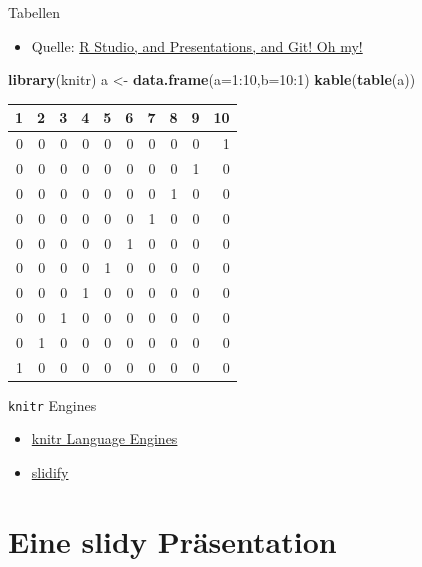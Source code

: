 \documentclass[ignorenonframetext,]{beamer}
\newenvironment{Shaded}{}{}
\newcommand{\KeywordTok}[1]{\textcolor[rgb]{0.00,0.44,0.13}{\textbf{{#1}}}}
\newcommand{\DataTypeTok}[1]{\textcolor[rgb]{0.56,0.13,0.00}{{#1}}}
\newcommand{\DecValTok}[1]{\textcolor[rgb]{0.25,0.63,0.44}{{#1}}}
\newcommand{\StringTok}[1]{\textcolor[rgb]{0.25,0.44,0.63}{{#1}}}
\newcommand{\NormalTok}[1]{{#1}}
\providecommand{\tightlist}{%
\setlength{\itemsep}{0pt}\setlength{\parskip}{0pt}}
\begin{document}
\begin{frame}[fragile]{Tabellen}

\begin{itemize}
\tightlist
\item
  Quelle:
  \href{https://www.r-bloggers.com/r-studio-and-presentations-and-git-oh-my/}{R
  Studio, and Presentations, and Git! Oh my!}
\end{itemize}

\begin{Shaded}
\begin{Highlighting}[]
\KeywordTok{library}\NormalTok{(knitr)}
\NormalTok{a <-}\StringTok{ }\KeywordTok{data.frame}\NormalTok{(}\DataTypeTok{a=}\DecValTok{1}\NormalTok{:}\DecValTok{10}\NormalTok{,}\DataTypeTok{b=}\DecValTok{10}\NormalTok{:}\DecValTok{1}\NormalTok{)}
\KeywordTok{kable}\NormalTok{(}\KeywordTok{table}\NormalTok{(a))}
\end{Highlighting}
\end{Shaded}

\begin{longtable}[]{@{}rrrrrrrrrr@{}}
\toprule
1 & 2 & 3 & 4 & 5 & 6 & 7 & 8 & 9 & 10\tabularnewline
\midrule
\endhead
0 & 0 & 0 & 0 & 0 & 0 & 0 & 0 & 0 & 1\tabularnewline
0 & 0 & 0 & 0 & 0 & 0 & 0 & 0 & 1 & 0\tabularnewline
0 & 0 & 0 & 0 & 0 & 0 & 0 & 1 & 0 & 0\tabularnewline
0 & 0 & 0 & 0 & 0 & 0 & 1 & 0 & 0 & 0\tabularnewline
0 & 0 & 0 & 0 & 0 & 1 & 0 & 0 & 0 & 0\tabularnewline
0 & 0 & 0 & 0 & 1 & 0 & 0 & 0 & 0 & 0\tabularnewline
0 & 0 & 0 & 1 & 0 & 0 & 0 & 0 & 0 & 0\tabularnewline
0 & 0 & 1 & 0 & 0 & 0 & 0 & 0 & 0 & 0\tabularnewline
0 & 1 & 0 & 0 & 0 & 0 & 0 & 0 & 0 & 0\tabularnewline
1 & 0 & 0 & 0 & 0 & 0 & 0 & 0 & 0 & 0\tabularnewline
\bottomrule
\end{longtable}

\end{frame}

\begin{frame}{\texttt{knitr} Engines}

\begin{itemize}
\item
  \href{http://rmarkdown.rstudio.com/authoring_knitr_engines.html}{knitr
  Language Engines}
\item
  \href{http://slidify.org/}{slidify}
\end{itemize}

\end{frame}

\section{Eine slidy Präsentation}\label{eine-slidy-prasentation}
\end{document}

